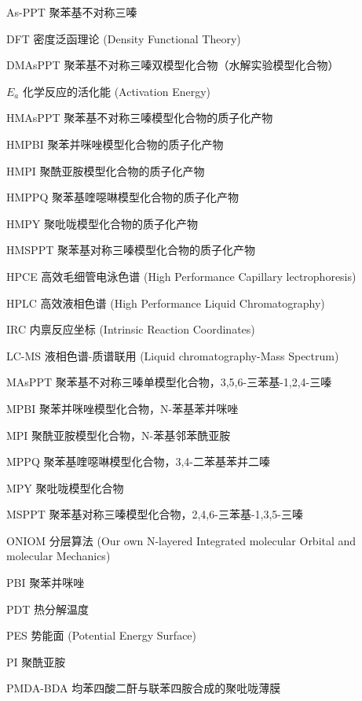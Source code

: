 
\begin{denotation}[3cm]
  \item[As-PPT]聚苯基不对称三嗪
  \item[DFT]密度泛函理论 (Density Functional Theory)
  \item[DMAsPPT]聚苯基不对称三嗪双模型化合物（水解实验模型化合物）
  \item[$E_a$]化学反应的活化能 (Activation Energy)
  \item[HMAsPPT]聚苯基不对称三嗪模型化合物的质子化产物
  \item[HMPBI]聚苯并咪唑模型化合物的质子化产物
  \item[HMPI]聚酰亚胺模型化合物的质子化产物
  \item[HMPPQ]聚苯基喹噁啉模型化合物的质子化产物
  \item[HMPY]聚吡咙模型化合物的质子化产物
  \item[HMSPPT]聚苯基对称三嗪模型化合物的质子化产物
  \item[HPCE]高效毛细管电泳色谱 (High Performance Capillary lectrophoresis)
  \item[HPLC]高效液相色谱 (High Performance Liquid Chromatography)
  \item[IRC]内禀反应坐标 (Intrinsic Reaction Coordinates)
  \item[LC-MS]液相色谱-质谱联用 (Liquid chromatography-Mass Spectrum)
  \item[MAsPPT]聚苯基不对称三嗪单模型化合物，3,5,6-三苯基-1,2,4-三嗪
  \item[MPBI]聚苯并咪唑模型化合物，N-苯基苯并咪唑
  \item[MPI]聚酰亚胺模型化合物，N-苯基邻苯酰亚胺
  \item[MPPQ]聚苯基喹噁啉模型化合物，3,4-二苯基苯并二嗪
  \item[MPY]聚吡咙模型化合物
  \item[MSPPT]聚苯基对称三嗪模型化合物，2,4,6-三苯基-1,3,5-三嗪
  \item[ONIOM]分层算法 (Our own N-layered Integrated molecular Orbital and molecular Mechanics)
  \item[PBI]聚苯并咪唑
  \item[PDT]热分解温度
  \item[PES]势能面 (Potential Energy Surface)
  \item[PI]聚酰亚胺
  \item[PMDA-BDA]均苯四酸二酐与联苯四胺合成的聚吡咙薄膜

\end{denotation}
